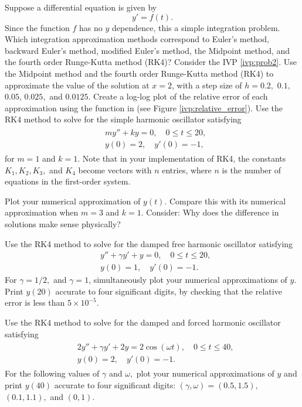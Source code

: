 Suppose a differential equation is given by
\[ y' = f(t).\]
Since the function $f$ has no $y$ dependence, this a simple integration problem. 
Which integration approximation methods correspond to Euler's method, backward Euler's method, modified Euler's method, the Midpoint method, and the fourth order Runge-Kutta method (RK4)?
 Consider the IVP \eqref{ivp:prob2}.
Use the Midpoint method and the fourth order Runge-Kutta method (RK4) to approximate the value of the solution at $x = 2$, with a step size of $h = 0.2,$ $ 0.1,$ $0.05 $, $0.025,$ and $0.0125.$ 
Create a log-log plot of the relative error of each approximation using the  function in  (see Figure \ref{ivp:relative_error}).
 Use the RK4 method to solve for the simple harmonic oscillator satisfying 
\begin{align}
	\begin{split}
&{}my'' + ky = 0,\quad 0 \leq t \leq 20, \\
&{}y(0) = 2, \quad
y'(0) = -1,
	\end{split}
	\label{ivp:simple_oscillator}
\end{align}
for $m = 1$ and $k =1$. Note that in your implementation of RK4, the constants $K_1, K_2, K_3,$ and $K_4$ become vectors with $n$ entries, where $n$ is the number of equations in the first-order system.

Plot your numerical approximation of $y(t)$.  
Compare this with its numerical approximation when $m = 3$ and $k =1$. Consider: Why does the difference in solutions make sense physically?

Use the RK4 method to solve for the damped free harmonic oscillator satisfying 
\begin{align*}
&{}y'' +\gamma y'+ y = 0, \quad 0 \leq t \leq 20,\\
&{}y(0) = 1, \quad
y'(0) = -1.
\end{align*}
For $\gamma = 1/2,$ and $\gamma = 1$, simultaneously plot your numerical approximations of $y$.  
Print $y(20)$ accurate to four significant digits, by checking that the relative error is less than $5\times 10^{-5}$.

Use the RK4 method to solve for the damped and forced harmonic oscillator satisfying 
\begin{align}
	\begin{split}
&{}2y'' + \gamma y' + 2y = 2 \cos (\omega t), \quad 0 \leq t \leq 40,\\
&{}y(0) = 2, \quad
y'(0) = -1. 
	\end{split}
	\label{ivp:damped_forced_oscillator}
\end{align}
For the following values of $\gamma$ and $\omega,$ plot your numerical approximations of $y$ and print $y(40)$ accurate to four significant digits: $(\gamma, \omega) = (0.5, 1.5),$ $(0.1, 1.1),$ and $(0, 1).$
